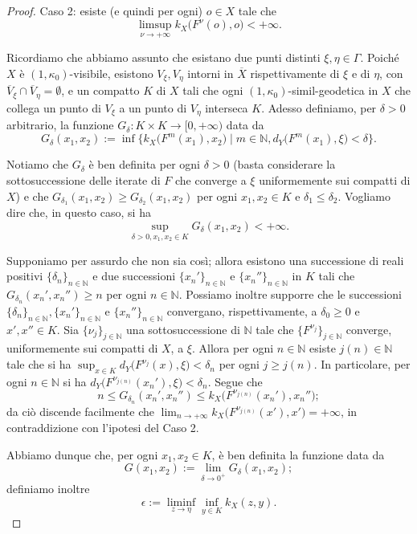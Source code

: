 \begin{proof}
    Caso 2: esiste (e quindi per ogni) $o \in X$ tale che
    $$\limsup_{\nu\longrightarrow+\infty} k_X\big(F^\nu(o),o\big)<+\infty.$$
    
    Ricordiamo che abbiamo assunto che esistano due punti distinti $\xi,\eta\in\Gamma$. Poiché $X$ è $(1,\kappa_0)$-visibile, esistono $V_\xi, V_\eta$ intorni in $\overline{X}$ rispettivamente di $\xi$ e di $\eta$, con $\overline{V}_\xi\cap\overline{V}_\eta=\emptyset$, e un compatto $K$ di $X$ tali che ogni $(1,\kappa_0)$-simil-geodetica in $X$ che collega un punto di $V_\xi$ a un punto di $V_\eta$ interseca $K$.
    Adesso definiamo, per $\delta>0$ arbitrario, la funzione $G_\delta:K\times K\longrightarrow [0,+\infty)$ data da
    $$G_\delta(x_1,x_2):=\inf\big\{k_X\big(F^m(x_1),x_2\big)\mid m\in\mathbb{N}, d_Y\big(F^m(x_1),\xi\big)<\delta\big\}.$$

    Notiamo che $G_\delta$ è ben definita per ogni $\delta>0$ (basta considerare la sottosuccessione delle iterate di $F$ che converge a $\xi$ uniformemente sui compatti di $X$) e che $G_{\delta_1}(x_1,x_2) \ge G_{\delta_2}(x_1,x_2)$ per ogni $x_1,x_2 \in K$ e $\delta_1 \le \delta_2$. Vogliamo dire che, in questo caso, si ha
    $$\sup_{\delta>0,x_1,x_2\in K}G_\delta(x_1,x_2)<+\infty.$$

    Supponiamo per assurdo che non sia così; allora esistono una successione di reali positivi $\{\delta_n\}_{n\in\mathbb{N}}$ e due successioni $\{x_n'\}_{n\in\mathbb{N}}$ e $\{x_n''\}_{n\in\mathbb{N}}$ in $K$ tali che $G_{\delta_n}(x_n',x_n'') \ge n$ per ogni $n\in\mathbb{N}$. Possiamo inoltre supporre che le successioni $\{\delta_n\}_{n\in\mathbb{N}}, \{x_n'\}_{n\in\mathbb{N}}$ e $\{x_n''\}_{n\in\mathbb{N}}$ convergano, rispettivamente, a $\delta_0 \ge 0$ e $x',x''\in K$. Sia $\{\nu_j\}_{j\in\mathbb{N}}$ una sottosuccessione di $\mathbb{N}$ tale che $\{F^{\nu_j}\}_{j\in\mathbb{N}}$ converge, uniformemente sui compatti di $X$, a $\xi$. Allora per ogni $n\in\mathbb{N}$ esiste $j(n)\in\mathbb{N}$ tale che si ha $\displaystyle\sup_{x\in K}d_Y\big(F^{\nu_j}(x),\xi\big)<\delta_n$ per ogni $j \ge j(n)$. In particolare, per ogni $n \in \mathbb{N}$ si ha $d_Y\big(F^{\nu_{j(n)}}(x_n'),\xi\big)<\delta_n$. Segue che
    $$n \le G_{\delta_n}(x_n',x_n'') \le k_X\big(F^{\nu_{j(n)}}(x_n'),x_n''\big);$$
    da ciò discende facilmente che $\displaystyle\lim_{n\longrightarrow+\infty}k_X\big(F^{\nu_{j(n)}}(x'),x'\big)=+\infty$, in contraddizione con l'ipotesi del Caso 2.

    Abbiamo dunque che, per ogni $x_1,x_2 \in K$, è ben definita la funzione data da
    $$G(x_1,x_2):=\lim_{\delta\longrightarrow 0^+}G_\delta(x_1,x_2);$$
    definiamo inoltre
    $$\epsilon:=\liminf_{z \longrightarrow\eta}\inf_{y\in K}k_X(z,y).$$
    

\end{proof}

